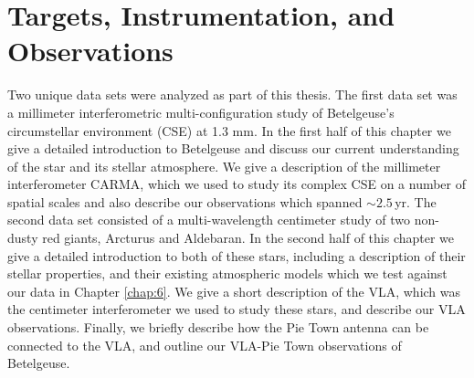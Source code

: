 
\chapter{Targets, Instrumentation, and Observations}
\label{chap:3}

Two unique data sets were analyzed as part of this thesis. The first data set was a millimeter interferometric multi-configuration study of Betelgeuse's circumstellar environment (CSE) at 1.3 mm. In the first half of this chapter we give a detailed introduction to Betelgeuse and discuss our current understanding of the star and its stellar atmosphere. We give a description of the millimeter interferometer CARMA, which we used to study its complex CSE on a number of spatial scales and also describe our observations which spanned $\sim 2.5$\,yr. The second data set consisted of a multi-wavelength centimeter study of two non-dusty red giants, Arcturus and Aldebaran. In the second half of this chapter we give a detailed introduction to both of these stars, including a description of their stellar properties, and their existing atmospheric models which we test against our data in Chapter \ref{chap:6}. We give a short description of the VLA, which was the centimeter interferometer we used to study these stars, and describe our VLA observations. Finally, we briefly describe how the Pie Town antenna can be connected to the VLA, and outline our VLA-Pie Town observations of Betelgeuse.

